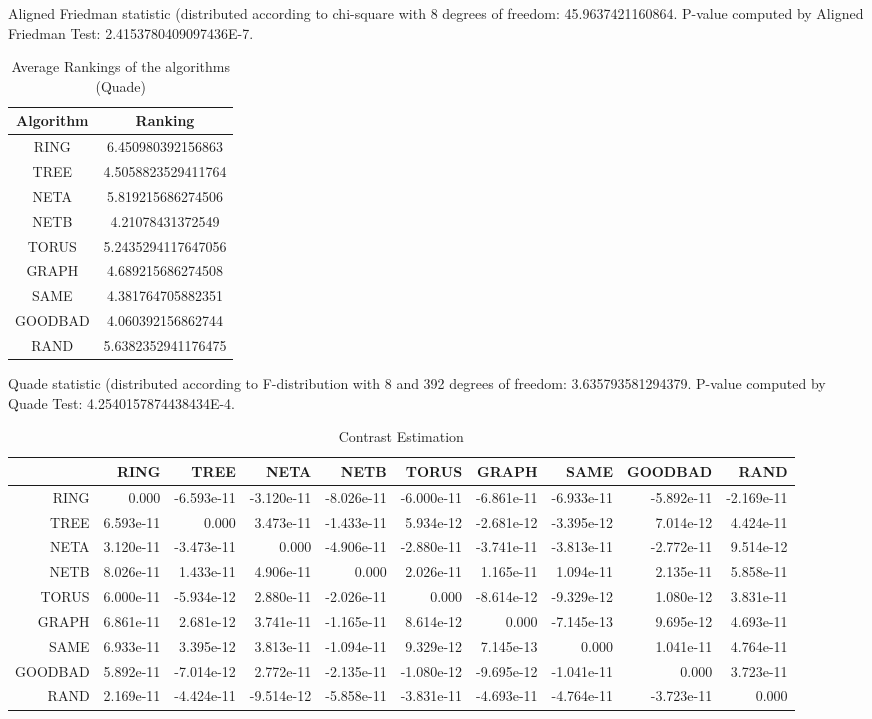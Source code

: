 \documentclass[a4paper,10pt]{article}
\begin{document}
\begin{landscape}
Aligned Friedman statistic (distributed according to chi-square with 8 degrees of freedom: 45.9637421160864. 
P-value computed by Aligned Friedman Test: 2.4153780409097436E-7.\newline


\newpage

\begin{table}[!htp]
\centering
\caption{Average Rankings of the algorithms (Quade)
}\begin{tabular}{c|c}
Algorithm&Ranking\\
\hline
 RING&6.450980392156863\\
 TREE&4.5058823529411764\\
 NETA&5.819215686274506\\
 NETB&4.21078431372549\\
 TORUS&5.2435294117647056\\
 GRAPH&4.689215686274508\\
 SAME&4.381764705882351\\
 GOODBAD&4.060392156862744\\
 RAND&5.6382352941176475\\
\end{tabular}
\end{table}
Quade statistic (distributed according to F-distribution with 8 and 392 degrees of freedom: 3.635793581294379. 
P-value computed by Quade Test: 4.2540157874438434E-4.\newline


\newpage

\begin{table}[!htp]
\centering\tiny
\caption{Contrast Estimation}
\begin{tabular}{
|r|r|r|r|r|r|r|r|r|r|}
\hline
 & RING& TREE& NETA& NETB& TORUS& GRAPH& SAME& GOODBAD& RAND\\
\hline
 RING&0.000&-6.593e-11&-3.120e-11&-8.026e-11&-6.000e-11&-6.861e-11&-6.933e-11&-5.892e-11&-2.169e-11\\
\hline
 TREE&6.593e-11&0.000&3.473e-11&-1.433e-11&5.934e-12&-2.681e-12&-3.395e-12&7.014e-12&4.424e-11\\
\hline
 NETA&3.120e-11&-3.473e-11&0.000&-4.906e-11&-2.880e-11&-3.741e-11&-3.813e-11&-2.772e-11&9.514e-12\\
\hline
 NETB&8.026e-11&1.433e-11&4.906e-11&0.000&2.026e-11&1.165e-11&1.094e-11&2.135e-11&5.858e-11\\
\hline
 TORUS&6.000e-11&-5.934e-12&2.880e-11&-2.026e-11&0.000&-8.614e-12&-9.329e-12&1.080e-12&3.831e-11\\
\hline
 GRAPH&6.861e-11&2.681e-12&3.741e-11&-1.165e-11&8.614e-12&0.000&-7.145e-13&9.695e-12&4.693e-11\\
\hline
 SAME&6.933e-11&3.395e-12&3.813e-11&-1.094e-11&9.329e-12&7.145e-13&0.000&1.041e-11&4.764e-11\\
\hline
 GOODBAD&5.892e-11&-7.014e-12&2.772e-11&-2.135e-11&-1.080e-12&-9.695e-12&-1.041e-11&0.000&3.723e-11\\
\hline
 RAND&2.169e-11&-4.424e-11&-9.514e-12&-5.858e-11&-3.831e-11&-4.693e-11&-4.764e-11&-3.723e-11&0.000\\
\hline


\end{tabular}
\end{table}
\end{landscape}
\end{document}
